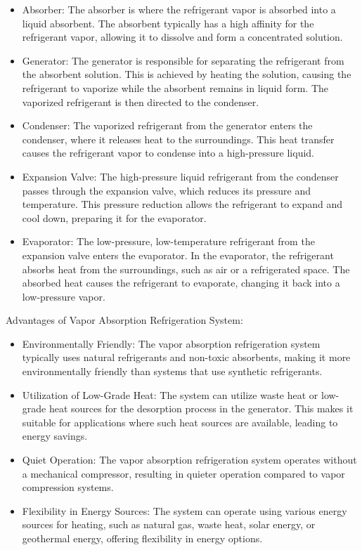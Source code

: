 \documentclass{article}
\begin{document}
\begin{itemize}
  \item Absorber: The absorber is where the refrigerant vapor is absorbed into a liquid absorbent. The absorbent typically has a high affinity for the refrigerant vapor, allowing it to dissolve and form a concentrated solution.
  \item Generator: The generator is responsible for separating the refrigerant from the absorbent solution. This is achieved by heating the solution, causing the refrigerant to vaporize while the absorbent remains in liquid form. The vaporized refrigerant is then directed to the condenser.
  \item Condenser: The vaporized refrigerant from the generator enters the condenser, where it releases heat to the surroundings. This heat transfer causes the refrigerant vapor to condense into a high-pressure liquid.
  \item Expansion Valve: The high-pressure liquid refrigerant from the condenser passes through the expansion valve, which reduces its pressure and temperature. This pressure reduction allows the refrigerant to expand and cool down, preparing it for the evaporator.
  \item Evaporator: The low-pressure, low-temperature refrigerant from the expansion valve enters the evaporator. In the evaporator, the refrigerant absorbs heat from the surroundings, such as air or a refrigerated space. The absorbed heat causes the refrigerant to evaporate, changing it back into a low-pressure vapor.
\end{itemize}


Advantages of Vapor Absorption Refrigeration System:\\

\begin{itemize}
  \item Environmentally Friendly: The vapor absorption refrigeration system typically uses natural refrigerants and non-toxic absorbents, making it more environmentally friendly than systems that use synthetic refrigerants.
  \item Utilization of Low-Grade Heat: The system can utilize waste heat or low-grade heat sources for the desorption process in the generator. This makes it suitable for applications where such heat sources are available, leading to energy savings.
  \item Quiet Operation: The vapor absorption refrigeration system operates without a mechanical compressor, resulting in quieter operation compared to vapor compression systems.
  \item Flexibility in Energy Sources: The system can operate using various energy sources for heating, such as natural gas, waste heat, solar energy, or geothermal energy, offering flexibility in energy options.
\end{itemize}
\end{document}
